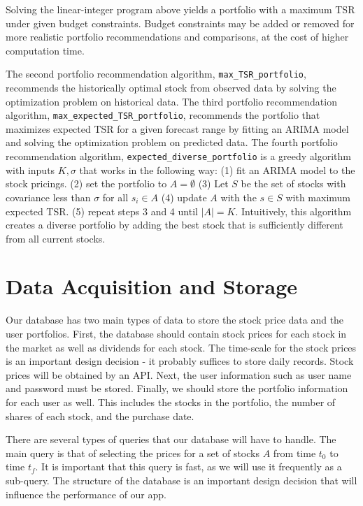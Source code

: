 \documentclass{article}
\begin{document}
Solving the linear-integer program above yields a portfolio with a maximum TSR under given budget constraints. Budget constraints may be added or removed for more realistic portfolio recommendations and comparisons, at the cost of higher computation time.

The second portfolio recommendation algorithm, \texttt{max\_TSR\_portfolio}, recommends the historically optimal stock from observed data by solving the optimization problem on historical data. The third portfolio recommendation algorithm, \texttt{max\_expected\_TSR\_portfolio}, recommends the portfolio that maximizes expected TSR for a given forecast range by fitting an ARIMA model and solving the optimization problem on predicted data. The fourth portfolio recommendation algorithm, \texttt{expected\_diverse\_portfolio} is a greedy algorithm with inputs $K, \sigma$ that works in the following way: (1) fit an ARIMA model to the stock pricings. (2) set the portfolio to $A = \emptyset$ (3) Let $S$ be the set of stocks with covariance less than $\sigma$ for all $s_i \in A$ (4) update $A$ with the $s \in S$ with maximum expected TSR. (5) repeat steps 3 and 4 until $|A| = K$. Intuitively, this algorithm creates a diverse portfolio by adding the best stock that is sufficiently different from all current stocks.

\section{Data Acquisition and Storage}
Our database has two main types of data to store \textemdash the stock price data and the user portfolios. First, the database should contain stock prices for each stock in the market as well as dividends for each stock. The time-scale for the stock prices is an important design decision - it probably suffices to store daily records. Stock prices will be obtained by an API. Next, the user information such as user name and password must be stored. Finally, we should store the portfolio information for each user as well. This includes the stocks in the portfolio, the number of shares of each stock, and the purchase date.

There are several types of queries that our database will have to handle. The main query is that of selecting the prices for a set of stocks $A$ from time $t_0$ to time $t_f$. It is important that this query is fast, as we will use it frequently as a sub-query. The structure of the database is an important design decision that will influence the performance of our app.
\end{document}
